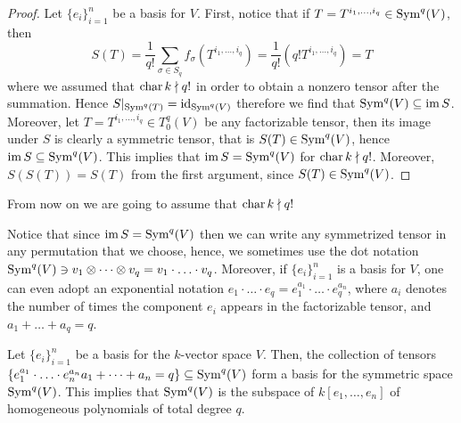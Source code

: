 \begin{proof}
Let \(\{e_i\}_{i=1}^n\) be a basis for \(V\). First, notice that if \(T =
T^{i_1, \dots, i_q} \in \operatorname{Sym}^q(V)\),
then
\[
  S(T) = \frac{1}{q!} \sum_{\sigma \in S_q} f_\sigma(T^{i_1, \dots,
  i_q}) = \frac{1}{q!} (q! T^{i_1, \dots, i_q}) = T
\]
where we assumed that \(\operatorname{char} k \nmid q!\) in order to obtain a nonzero tensor
after the summation. Hence \(S|_{\operatorname{Sym}^q(T)} = \operatorname{id}_{\operatorname{Sym}^q(V)}\) therefore we
find that \(\operatorname{Sym}^q(V) \subseteq \operatorname{im} S\). Moreover, let \(T = T^{i_1, \dots,
i_q} \in T_0^q(V)\) be any factorizable tensor, then its image under \(S\) is
clearly a symmetric tensor, that is \(S(T) \in \operatorname{Sym}^q(V)\), hence \(\operatorname{im} S
\subseteq \operatorname{Sym}^q(V)\). This implies that \(\operatorname{im} S = \operatorname{Sym}^q(V)\) for \(\operatorname{char} k
\nmid q!\). Moreover, \(S(S(T)) = S(T)\) from the first argument, since
\(S(T) \in \operatorname{Sym}^q(V)\).
\end{proof}

\begin{remark}
From now on we are going to assume that \(\operatorname{char} k \nmid q!\)
\end{remark}

\begin{notation}
Notice that since \(\operatorname{im} S = \operatorname{Sym}^q(V)\) then we can write any symmetrized
tensor in any permutation that we choose, hence, we sometimes use the dot
notation \(\operatorname{Sym}^q(V) \ni v_1 \otimes \dots \otimes v_q = v_1 \cdot \ldots
\cdot v_q\). Moreover, if \(\{e_i\}_{i=1}^n\) is a basis for \(V\), one can
even adopt an exponential notation \(e_1 \cdot \ldots \cdot e_q = e_1^{a_1}
\cdot \ldots \cdot e_q^{a_n}\), where \(a_i\) denotes the number of times the
component \(e_i\) appears in the factorizable tensor, and \(a_1 + \dots + a_q
= q\).
\end{notation}

\begin{proposition}
\label{prop: basis for symmetric power}
Let \(\{e_i\}_{i=1}^n\) be a basis for the \(k\)-vector space \(V\). Then, the
collection of tensors \(\{e_1^{a_1} \cdot \ldots \cdot e_n^{a_n} \relax a_1 + \dots
+ a_n = q\} \subseteq \operatorname{Sym}^q(V)\) form a basis for the symmetric space
\(\operatorname{Sym}^q(V)\). This implies that \(\operatorname{Sym}^q(V)\) is the subspace of \(k[e_1,
\dots, e_n]\) of homogeneous polynomials of total degree \(q\).
\end{proposition}

